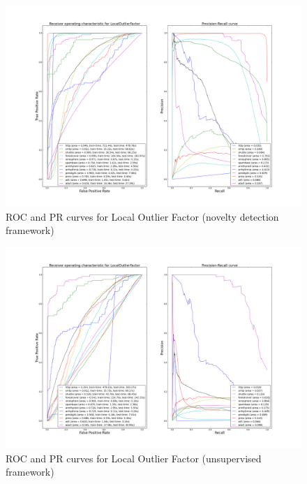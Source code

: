\begin{figure}[!ht]
  \centering
  \caption{ROC and PR curves for Local Outlier Factor (novelty detection framework)}
  \label{evaluation:fig:lof_roc_pr}
  \includegraphics[trim=175 80 175 98, clip, width=\linewidth]{fig_source/evaluation_fig/bench_lof_roc_pr_supervised_factorized.png}
\end{figure}

\begin{figure}[!ht]
  \centering
  \caption{ROC and PR curves for Local Outlier Factor (unsupervised framework)}
  \label{evaluation:fig:lof_roc_pr_unsupervised}
  \includegraphics[trim=175 80 175 98, clip, width=\linewidth]{fig_source/evaluation_fig/bench_lof_roc_pr_unsupervised_factorized.png}
\end{figure}

